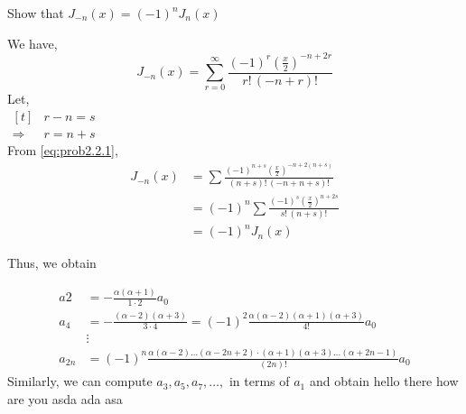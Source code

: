 \documentclass[12pt,class=book,crop=false]{standalone}
\begin{document}
\begin{prob}
    Show that $ J_{-n}(x)=(-1)^nJ_n(x) $
\end{prob}
\begin{soln}
    We have,
    \begin{equation}
        J_{-n}(x)=\sum_{r=0}^\infty \frac{(-1)^r\left( \frac{x}{2} \right)^{-n+2r}}{r!\,(-n+r)!} \label{eq:prob2.2.1}
    \end{equation}
    Let,\\
    \indent $ \begin{aligned}[t]
        &r-n=s\\
        \Rightarrow & r=n+s
    \end{aligned} $\\
    From \eqref{eq:prob2.2.1},
    \begin{align*}
        J_{-n}(x)&=\sum\frac{(-1)^{n+s}\left( \frac{x}{2} \right)^{-n+2(n+s)}}{(n+s)!\,(-n+n+s)!}\\
        &=(-1)^n\sum\frac{(-1)^{s}\left( \frac{x}{2} \right)^{n+2s}}{s!\,(n+s)!}\\
        &=(-1)^nJ_n(x)
    \end{align*}
\end{soln}
Thus, we obtain
\begin{soln}
    
    \begin{align*}
        a2	&=-\frac{\alpha(\alpha+1)}{1\cdot 2}a_0\\
        a_4&=-\frac{(\alpha-2)(\alpha + 3)}{3\cdot4}=(-1)^2\frac{\alpha(\alpha-2)(\alpha + 1)(\alpha + 3)}{4!}a_0\\
        &\vdots\\
        a_{2n}&=(-1)^n\frac{\alpha(\alpha - 2)\dots (\alpha - 2n + 2) \cdot (\alpha + 1)(\alpha + 3) \dots (\alpha + 2n - 1)}{(2n)!}a_0
    \end{align*}
    Similarly, we can compute $ a_3, a_5, a_7,\dots, $ in terms of $ a_1 $ and obtain
    hello there how are you asda ada asa 
\end{soln}
\end{document}
